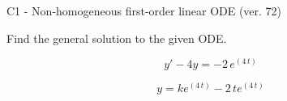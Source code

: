 \begin{exercise}
  \begin{exerciseTitle}C1 - Non-homogeneous first-order linear ODE (ver. 72)\end{exerciseTitle}
  \begin{exerciseStatement}
    
Find the general solution to the given ODE.

    
\[y'-4y= -2 \, e^{\left(4 \, t\right)}\]

  \end{exerciseStatement}
  \begin{exerciseAnswer}
    
\[y= k e^{\left(4 \, t\right)} - 2 \, t e^{\left(4 \, t\right)}\]

  \end{exerciseAnswer}
\end{exercise}
